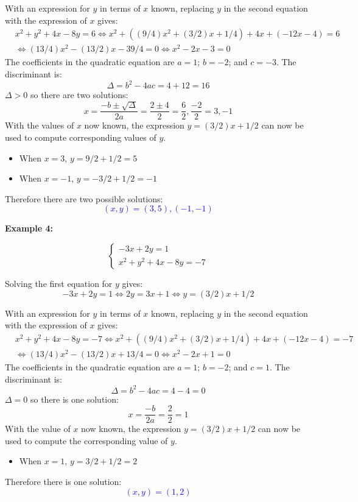 \documentclass{article}
\newcommand{\dg}[1]{\textcolor{dark_green}{#1}}
\newcommand{\blue}[1]{\textcolor{blue}{#1}}
\begin{document}
With an expression for \(y\) in terms of \(x\) known, replacing \(y\) in the second equation with the expression of \(x\) gives:
\begin{align*}
& x^2 + y^2 + 4x - 8y = 6 
\iff x^2 + ((9/4)x^2 + (3/2)x + 1/4) + 4x + (-12x - 4) = 6 \\  
& \iff (13/4)x^2 - (13/2)x - 39/4 = 0 
\iff x^2 - 2x - 3 = 0
\end{align*}
The coefficients in the quadratic equation are \(a = 1\); \(b = -2\); and \(c = -3\). The discriminant is:
\[\Delta = b^2 - 4ac = 4 + 12 = 16\]
\(\Delta > 0\) so there are two solutions:
\[x = \frac{-b \pm \sqrt{\Delta}}{2a} = \frac{2 \pm 4}{2} = \frac{6}{2}, \frac{-2}{2} = 3, -1\]
With the values of \(x\) now known, the expression \(y = (3/2)x + 1/2\) can now be used to compute corresponding values of \(y\).
\begin{itemize}
\item When \(x = 3\), \(y = 9/2 + 1/2 = 5\)
\item When \(x = -1\), \(y = -3/2 + 1/2 = -1\)
\end{itemize}
Therefore there are two possible solutions:
\blue{\[(x,y) = (3,5), (-1,-1)\]}




\textbf{Example 4:}

\dg{\[\left\{\begin{array}{c}
-3x + 2y = 1 \\
x^2 + y^2 + 4x - 8y = -7
\end{array}\right.\]}

Solving the first equation for \(y\) gives:
\[-3x + 2y = 1 \iff 2y = 3x + 1 \iff y = (3/2)x + 1/2\]

With an expression for \(y\) in terms of \(x\) known, replacing \(y\) in the second equation with the expression of \(x\) gives:
\begin{align*}
& x^2 + y^2 + 4x - 8y = -7 
\iff x^2 + ((9/4)x^2 + (3/2)x + 1/4) + 4x + (-12x - 4) = -7 \\  
& \iff (13/4)x^2 - (13/2)x + 13/4 = 0 
\iff x^2 - 2x + 1 = 0
\end{align*}
The coefficients in the quadratic equation are \(a = 1\); \(b = -2\); and \(c = 1\). The discriminant is:
\[\Delta = b^2 - 4ac = 4 - 4 = 0\]
\(\Delta = 0\) so there is one solution:
\[x = \frac{-b}{2a} = \frac{2}{2} = 1\]
With the value of \(x\) now known, the expression \(y = (3/2)x + 1/2\) can now be used to compute the corresponding value of \(y\).
\begin{itemize}
\item When \(x = 1\), \(y = 3/2 + 1/2 = 2\)
\end{itemize}
Therefore there is one solution:
\blue{\[(x,y) = (1,2)\]}
\end{document}
